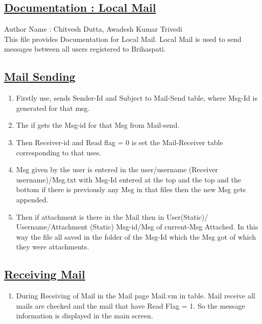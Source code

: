 \documentclass{article}
\begin{document}
\begin{center}
\section*{\underline{Documentation : Local Mail}}
                         Author Name : Chitvesh Dutta, Awadesh Kumar Trivedi\\
This file provides Documentation for Local Mail.
Local Mail is used to send messages between all users registered to Brihaspati.
\end{center}
\begin{center}

\label{figure:LocalMail.latex}
\end{center}
\subsection*{\underline{Mail Sending}}
    \begin{enumerate}
      \item Firstly use, sends Sender-Id and Subject to Mail-Send table, where Msg-Id is     
       generated for that msg.
      \item The if gets the Msg-id for that Msg from Mail-send.
         \item Then Receiver-id and Read flag = 0 is set the Mail-Receiver table corresponding to          
            that uses.
       \item Msg given by the user is entered in the user/username (Receiver username)/Msg.txt       
             with Msg-Id entered at the top and the top and the bottom if there is previously any 
	      Msg in that files then the new Msg gets appended.
	\item Then if attachment is there in the Mail then in User(Static)/ Username/Attachment
	      (Static) Msg-id/Msg of current-Msg Attached.
	      In this way the file all saved in the folder of the Msg-Id which the Msg got of 
	      which they were attachments.
\begin{center}

\label{figure:Send_Loclmail.latex}
\end{center}
\end{enumerate}
\subsection*{\underline{Receiving Mail}}
\begin{enumerate}
		\item During Receiving of Mail in the Mail page Mail.vm in table. Mail receive all mails		      are checked and the mail that have Read Flag = 1. So the message information is displayed in the main screen.
\begin{center}

\label{figure:Recv_LoclMail.latex}
\end{center}
\end{enumerate}
\end{document}
